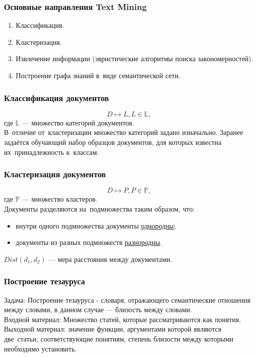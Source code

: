 \documentclass{beamer}
\begin{document}
\begin{frame}
\frametitle{Основные направления Text Mining}
\begin{enumerate}
\item{Классификация.}
\item{Кластеризация.}
\item{Извлечение информации (эвристические алгоритмы поиска закономерностей).}
\item{Построение графа знаний в~виде семантической сети.}

\end{enumerate}
\end{frame}

\begin{frame}
\frametitle{Классификация документов}
$$D \mapsto L, L \in \mathbb{L},$$
\vspace{1cm}
где $\mathbb{L}$ --- множество категорий документов.\\
\vspace{1cm}
В~отличие от~кластеризации множество категорий задано изначально.
\vspace{1cm}
Заранее задаётся обучающий набор образцов документов, для которых известна их~принадлежность к~классам.
\end{frame}

\begin{frame}
\frametitle{Кластеризация документов}
$$D \mapsto P, P \in \mathbb{P},$$
\vspace{1cm}
где $\mathbb{P}$ --- множество кластеров.\\
\vspace{1cm}
Документы разделяются на~подмножества таким образом, что:

\begin{itemize}
\item{внутри одного подмножества документы \underline{однородны};}
\item{документы из разных подмножеств \underline{разнородны}.}
\end{itemize}
\vspace{1cm}
$Dist(d_{1},d_{2})$ --- мера расстояния между документами.
\end{frame}

\begin {frame}
\frametitle{Построение тезауруса}
Задача: Построение тезауруса - словаря, отражающего семантические отношения
между словами, в данном случае --- близость между словами.\\
\vspace{1cm}
Входной материал: Множество статей, которые рассматриваются как понятия.\\
\vspace{1cm}
Выходной материал: значение функции, аргументами которой являются две~статьи, 
соответствующие понятиям, степень близости между которыми необходимо установить.
\end{frame}
\end{document}

